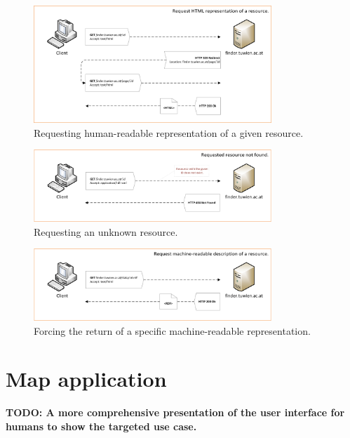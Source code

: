 \documentclass[draft,final]{vutinfth} %
\newcommand{\todo}[1]{{\color{red}\textbf{TODO: {#1}}}} %
\begin{document}
\begin{figure}[H]
    \centering
    \includegraphics[width=0.8\textwidth]{graphics/solution/uri-strategy/uriStrategyHumanReadable.png}
    \caption{Requesting human-readable representation of a given resource.}
    \label{fig:solution-architectural-prototype:ld-publishing:human-readable}
\end{figure}

\begin{figure}[H]
    \centering
    \includegraphics[width=0.8\textwidth]{graphics/solution/uri-strategy/uriStrategyErrorHandling.png}
    \caption{Requesting an unknown resource.}
    \label{fig:solution-architectural-prototype:ld-publishing:human-readable}
\end{figure}

\begin{figure}[H]
    \centering
    \includegraphics[width=0.8\textwidth]{graphics/solution/uri-strategy/uriStrategyForceMachineReadable.png}
    \caption{Forcing the return of a specific machine-readable representation.}
    \label{fig:solution-architectural-prototype:ld-publishing:force-machine-readable}
\end{figure}


\section{Map application}
\label{solution-map-application}
\todo{A more comprehensive presentation of the user interface for humans to show the targeted use case.}
\end{document}
